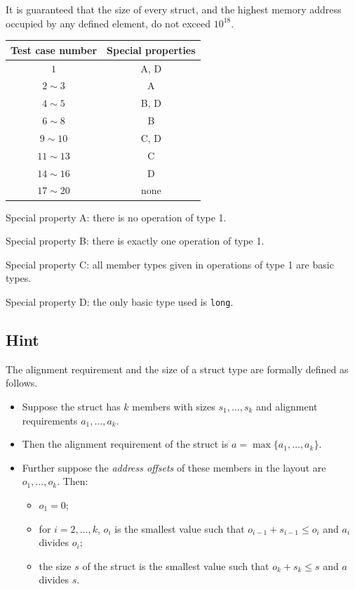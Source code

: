 \documentclass[11pt]{article}
\begin{document}
It is guaranteed that the size of every struct, and the highest memory
address occupied by any defined element, do not exceed $10^{18}$.

\begin{center}
\begin{tabular}{cc}
\toprule
Test case number & Special properties \\
\midrule
$1$ & A, D \\
$2 \sim 3$ & A \\
$4 \sim 5$ & B, D \\
$6 \sim 8$ & B \\
$9 \sim 10$ & C, D \\
$11 \sim 13$ & C \\
$14 \sim 16$ & D \\
$17 \sim 20$ & none \\
\bottomrule
\end{tabular}
\end{center}

Special property A: there is no operation of type 1.

Special property B: there is exactly one operation of type 1.

Special property C: all member types given in operations of type 1 are
basic types.

Special property D: the only basic type used is \texttt{long}.

\subsection*{Hint}

The alignment requirement and the size of a struct type are formally
defined as follows.
\begin{itemize}
\item Suppose the struct has $k$ members with sizes $s_1, \ldots, s_k$
  and alignment requirements $a_1, \ldots, a_k$.
\item Then the alignment requirement of the struct is
  $a = \max\{a_1, \ldots, a_k\}$.
\item Further suppose the \emph{address offsets} of these members in the
  layout are $o_1, \ldots, o_k$.
  Then:
  \begin{itemize}
  \item $o_1 = 0$;
  \item for $i = 2, \ldots, k$, $o_i$ is the smallest value such that
    $o_{i-1} + s_{i-1} \le o_i$ and $a_i$ divides $o_i$;
  \item the size $s$ of the struct is the smallest value such that
    $o_k + s_k \le s$ and $a$ divides $s$.
  \end{itemize}
\end{itemize}
\end{document}
